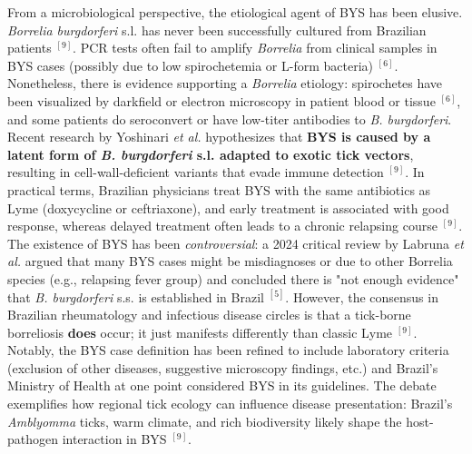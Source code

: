 \documentclass[11pt,letterpaper]{article}
\newcommand{\mycite}[1]{$^{[#1]}$}
\begin{document}
From a microbiological perspective, the etiological agent of BYS has been elusive. \textit{Borrelia burgdorferi} s.l. has never been successfully cultured from Brazilian patients \mycite{9}. PCR tests often fail to amplify \textit{Borrelia} from clinical samples in BYS cases (possibly due to low spirochetemia or L-form bacteria) \mycite{6}. Nonetheless, there is evidence supporting a \textit{Borrelia} etiology: spirochetes have been visualized by darkfield or electron microscopy in patient blood or tissue \mycite{6}, and some patients do seroconvert or have low-titer antibodies to \textit{B. burgdorferi}. Recent research by Yoshinari \textit{et al.} hypothesizes that \textbf{BYS is caused by a latent form of \textit{B. burgdorferi} s.l. adapted to exotic tick vectors}, resulting in cell-wall-deficient variants that evade immune detection \mycite{9}. In practical terms, Brazilian physicians treat BYS with the same antibiotics as Lyme (doxycycline or ceftriaxone), and early treatment is associated with good response, whereas delayed treatment often leads to a chronic relapsing course \mycite{9}. The existence of BYS has been \textit{controversial}: a 2024 critical review by Labruna \textit{et al.} argued that many BYS cases might be misdiagnoses or due to other Borrelia species (e.g., relapsing fever group) and concluded there is "not enough evidence" that \textit{B. burgdorferi} s.s. is established in Brazil \mycite{5}. However, the consensus in Brazilian rheumatology and infectious disease circles is that a tick-borne borreliosis \textbf{does} occur; it just manifests differently than classic Lyme \mycite{9}. Notably, the BYS case definition has been refined to include laboratory criteria (exclusion of other diseases, suggestive microscopy findings, etc.) and Brazil's Ministry of Health at one point considered BYS in its guidelines. The debate exemplifies how regional tick ecology can influence disease presentation: Brazil's \textit{Amblyomma} ticks, warm climate, and rich biodiversity likely shape the host-pathogen interaction in BYS \mycite{9}.
\end{document}
